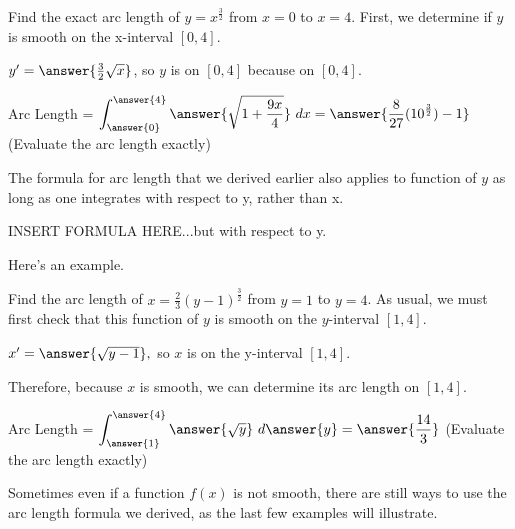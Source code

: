 \documentclass[handout,nooutcomes]{ximera}
\begin{document}
\begin{problem}

Find the exact arc length of $y = x^{\frac{3}{2}}$ from $x=0$ to $x=4$.  First, we determine if $y$ is smooth on the x-interval $[0,4]$.  

$y' = \answer{\frac{3}{2}\sqrt{x}}$, so $y$ is  on $[0,4]$ because  on $[0,4]$.  

\begin{problem}

Arc Length = $\displaystyle\int_{\answer{0}}^{\answer{4}} \answer{\sqrt{1+\frac{9x}{4}}} \ dx = \answer{\frac{8}{27}(10^{\frac{3}{2}})-1}$ (Evaluate the arc length exactly)

\end{problem}
\end{problem}

The formula for arc length that we derived earlier also applies to function of $y$ as long as one integrates with respect to y, rather than x.  

INSERT FORMULA HERE...but with respect to y. 


Here's an example.  


\begin{problem}
Find the arc length of $x = \frac{2}{3} (y-1)^{\frac{3}{2}}$ from $y=1$ to $y=4$.  As usual, we must first check that this function of $y$ is smooth on the $y$-interval $[1,4]$.  

$x' = \answer{\sqrt{y-1}},$ so $x$ is  on the y-interval $[1,4]$.

\begin{problem}
Therefore, because $x$ is smooth, we can determine its arc length on $[1,4]$.

Arc Length = $\displaystyle\int_{\answer{1}}^{\answer{4}} \answer{\sqrt{y}} \ d\answer{y} = \answer{\frac{14}{3}}$ (Evaluate the arc length exactly)

\end{problem}

\end{problem}

Sometimes even if a function $f(x)$ is not smooth, there are still ways to use the arc length formula we derived, as the last few examples will illustrate.
\end{document}
